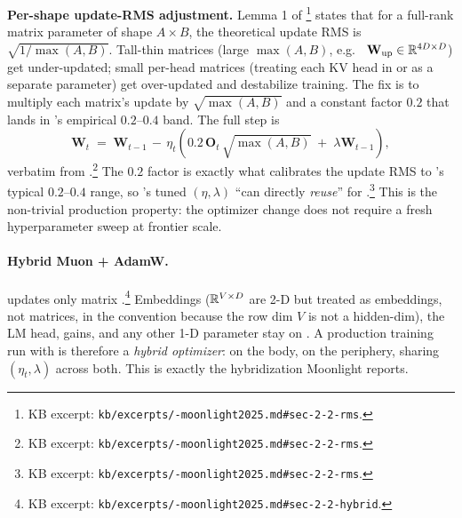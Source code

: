 \textbf{Per-shape update-RMS adjustment.} Lemma 1 of
\citet[\S 2.2]{muon-moonlight2025}\footnote{KB excerpt:
\texttt{kb/excerpts/-moonlight2025.md\#sec-2-2-rms}.} states that
for a full-rank matrix parameter of shape $A \times B$, the
theoretical  update RMS is $\sqrt{1/\max(A, B)}$. Tall-thin
matrices (large $\max(A, B)$, e.g.\  $\mathbf{W}_{\text{up}} \in
\mathbb{R}^{4D \times D}$) get under-updated; small per-head matrices
(treating each KV head in  \citep{ainslie2023} or 
\citep{deepseek-v2} as a separate parameter) get over-updated and
destabilize training. The fix is to multiply each matrix's update by
$\sqrt{\max(A, B)}$ and a constant factor $0.2$ that lands in 's
empirical $0.2$--$0.4$ band. The full step is
\begin{equation}
\mathbf{W}_t \;=\; \mathbf{W}_{t-1} \,-\, \eta_t \!\left(
   0.2 \,\mathbf{O}_t \,\sqrt{\max(A, B)} \;+\; \lambda \mathbf{W}_{t-1}
\right),
\label{eq:muon-final}
\tag{4'}
\end{equation}
verbatim from \citet[\S 2.2, eq.\ 4]{muon-moonlight2025}.\footnote{KB
excerpt: \texttt{kb/excerpts/-moonlight2025.md\#sec-2-2-rms}.}
The $0.2$ factor is exactly what calibrates the update RMS to 's
typical $0.2$--$0.4$ range, so 's tuned $(\eta, \lambda)$ ``can
directly \emph{reuse}'' for  \citep[\S
2.2]{muon-moonlight2025}.\footnote{KB excerpt:
\texttt{kb/excerpts/-moonlight2025.md\#sec-2-2-rms}.} This is the
non-trivial production property: the optimizer change does not
require a fresh hyperparameter sweep at frontier scale.

\paragraph{Hybrid Muon + AdamW.}
 updates only matrix  \citep[\S
2.2]{muon-moonlight2025}.\footnote{KB excerpt:
\texttt{kb/excerpts/-moonlight2025.md\#sec-2-2-hybrid}.}
Embeddings ($\mathbb{R}^{V \times D}$ are 2-D but treated as embeddings, not
matrices, in the  convention because the row dim $V$ is not a
hidden-dim), the LM head,  gains, and any other 1-D parameter
stay on . A production training run with  is therefore a
\emph{hybrid optimizer}:  on the body,  on the periphery,
sharing $(\eta_t, \lambda)$ across both. This is exactly the
hybridization Moonlight \citep[\S 3]{muon-moonlight2025} reports.

